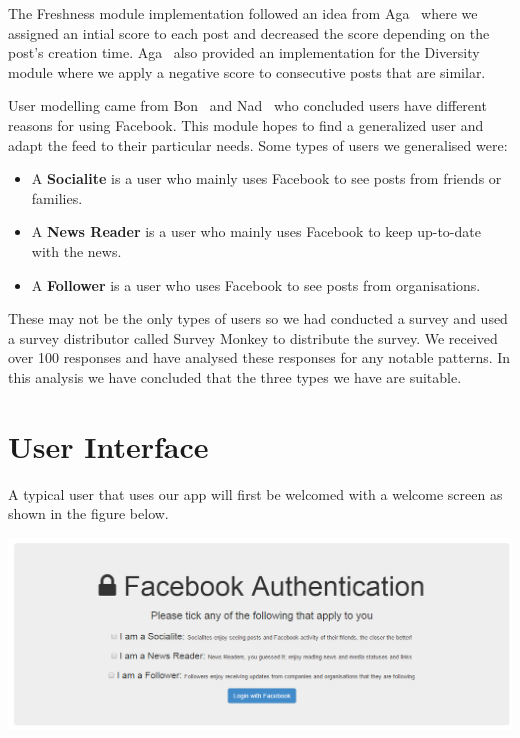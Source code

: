 The Freshness module implementation followed an idea from Aga~\cite{Aga2014} where we assigned an intial score to each post and decreased the score depending on the post's creation time. Aga~\cite{Aga2014} also provided an implementation for the Diversity module where we apply a negative score to consecutive posts that are similar. 

User modelling came from Bon~\cite{bonds2010myspace} and Nad~\cite{nadkarni2012people} who concluded users have different reasons for using Facebook. This module hopes to find a generalized user and adapt the feed to their particular needs. Some types of users we generalised were:

\begin{itemize}
	\item A \textbf{Socialite} is a user who mainly uses Facebook to see posts from friends or families.
 	\item A \textbf{News Reader} is a user who mainly uses Facebook to keep up-to-date with the news.
  	\item A \textbf{Follower} is a user who uses Facebook to see posts from organisations.
\end{itemize}

These may not be the only types of users so we had conducted a survey and used a survey distributor called Survey Monkey to distribute the survey. We received over 100 responses and have analysed these responses for any notable patterns. In this analysis we have concluded that the three types we have are suitable.

\section{User Interface}

A typical user that uses our app will first be welcomed with a welcome screen as shown in the figure below.

\begin{center}
  \includegraphics[scale=0.5]{images/mainscreen.png}
\end{center}

